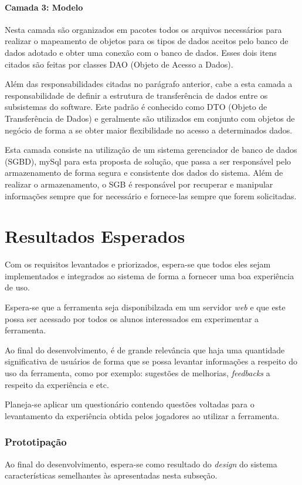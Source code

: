 \subsubsection{Camada 3: Modelo}
Nesta camada são organizados em pacotes todos os arquivos necessários para realizar o mapeamento de objetos para os tipos de dados aceitos pelo banco de dados
adotado e obter uma conexão com o banco de dados. Esses dois itens citados são feitas por classes DAO (Objeto de Acesso a Dados).

Além das responsabilidades citadas no parágrafo anterior, cabe a esta camada a responsabilidade de definir a estrutura de transferência de dados entre os subsistemas
do software. Este padrão é conhecido como DTO (Objeto de Transferência de Dados) e geralmente são utilizados em conjunto com objetos de negócio de forma a se obter maior
flexibilidade no acesso a determinados dados.

Esta camada consiste na utilização de um sistema gerenciador de banco de dados (SGBD), mySql para esta proposta de solução, que passa a ser responsável pelo armazenamento de forma segura e consistente
dos dados do sistema. Além de realizar o armazenamento, o SGB é responsável por recuperar e manipular informações sempre que for necessário e fornece-las sempre que forem solicitadas.

\chapter{Resultados Esperados}
Com os requisitos levantados e priorizados, espera-se que todos eles sejam implementados e integrados ao sistema de forma a fornecer uma boa experiência
de uso. 

Espera-se que a ferramenta seja disponibilzada em um servidor \textit{web} e que este possa ser acessado por todos os alunos interessados em experimentar
a ferramenta.

Ao final do desenvolvimento, é de grande relevância que haja uma quantidade significativa de usuários de forma que se possa levantar informações a respeito
do uso da ferramenta, como por exemplo: sugestões de melhorias, \textit{feedbacks} a respeito da experiência e etc.

Planeja-se aplicar um questionário contendo questões voltadas para o levantamento da experiência obtida pelos jogadores ao utilizar a ferramenta.

\subsection{Prototipação}
Ao final do desenvolvimento, espera-se como resultado do \textit{design} do sistema características semelhantes às apresentadas nesta subseção. 

